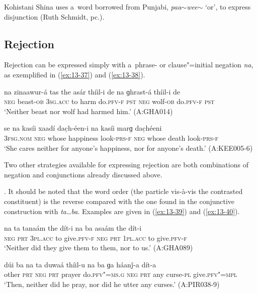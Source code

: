 Kohistani Shina uses a~word borrowed from Punjabi, \textit{paa$\sim$wee$\sim$} `or', to express disjunction (Ruth Schmidt, pc.).


\subsection{Rejection}
\label{subsec:13-2-4}

 Rejection can be expressed simply with a~phrase- or clause"=initial negation \textit{na}, as exemplified in (\ref{ex:13-37}) and (\ref{ex:13-38}).

\begin{exe}
\ex
\label{ex:13-37}
\gll na zinaawur-á tas the asár thíil-i de na ɡhrast-á thíil-i de \\
\textsc{neg} beast-\textsc{ob} \textsc{3sg.acc} to harm do.\textsc{pfv-f} \textsc{pst}  \textsc{neg} wolf-\textsc{ob} do.\textsc{pfv-f} \textsc{pst} \\
\glt `Neither beast nor wolf had harmed him.' (A:GHA014)

\ex
\label{ex:13-38}
\gll se na kasíi xaadí dac̣h-éen-i na kasíi marɡ dac̣héeni \\
\textsc{3fsg.nom} \textsc{neg} whose happiness look-\textsc{prs-f}  \textsc{neg} whose death look-\textsc{prs-f}  \\
\glt `She cares neither for anyone's happiness, nor for anyone's death.' (A:KEE005-6) 
\end{exe}

Two other strategies available for expressing rejection are both combinations of negation and conjunctions already discussed above.


. It should be noted that the word order (the particle vis-à-vis the contrasted constituent) is the reverse compared with the one found in the conjunctive construction with \textit{ta{\ldots}ba}. Examples are given in (\ref{ex:13-39}) and (\ref{ex:13-40}).

\begin{exe}
\ex
\label{ex:13-39}
\gll na ta tanaám the dít-i na ba asaám the dít-i \\
\textsc{neg} \textsc{prt} \textsc{3pl.acc} to give.\textsc{pfv-f} \textsc{neg} \textsc{prt} \textsc{1pl.acc} to give.\textsc{pfv-f}  \\
\glt `Neither did they give them to them, nor to us.' (A:GHA089)

\ex
\label{ex:13-40}
\gll dúi ba na ta duwaá thíil-u na ba ɡa háanǰ-a dít-a \\
other \textsc{prt} \textsc{neg} \textsc{prt} prayer do.\textsc{pfv"=ms.g} \textsc{neg} \textsc{prt} any curse-\textsc{pl} give.\textsc{pfv"=mpl} \\
\glt `Then, neither did he pray, nor did he utter any curses.' (A:PIR038-9) 
\end{exe}

